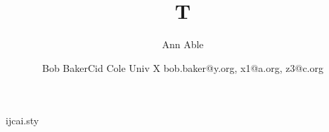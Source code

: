 \begin{filecontents*}[overwrite]{ijcai.sty}
\def\maketitle{\par\begingroup\@maketitle\endgroup
  \let\maketitle\relax \let\@maketitle\relax
  \gdef\@author{}\gdef\@title{}}
\def\@maketitle{\vbox{\centering{\LARGE\bf \@title \par}\vskip 0.2in
  {\def\and{\unskip\thinspace{\rm ,}\enspace}%
   \def\And{\unskip\enspace{\rm and}\enspace}%
   \def\affiliations{\egroup\par\bgroup\rm}%
   \def\emails{\egroup\par\bgroup\rm}%
   \bgroup\bf\@author\egroup}}}
\end{filecontents*}
\documentclass{article}
\usepackage{ijcai}
\title{T}
\author{Ann Able\and Bob Baker\And Cid Cole
\affiliations Univ X
\emails bob.baker@y.org, x1@a.org, z3@c.org}

\maketitle

